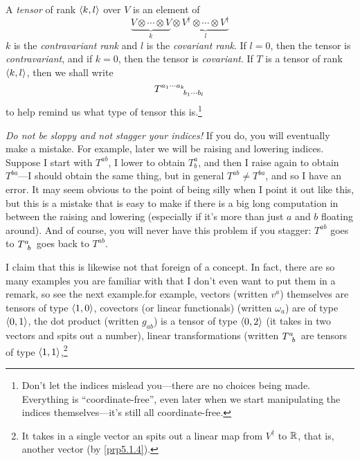 \begin{dfn}[Tensor]\label{Tensor}
A \emph{tensor} of rank $\langle k,l\rangle$ over $V$ is an element of
\begin{equation}
\underbrace{V\otimes \cdots \otimes V}_k\otimes \underbrace{V^{\dagger}\otimes \cdots \otimes V^{\dagger}}_l
\end{equation}
$k$ is the \emph{contravariant rank} and $l$ is the \emph{covariant rank}.  If $l=0$, then the tensor is \emph{contravariant}, and if $k=0$, then the tensor is \emph{covariant}.  If $T$ is a tensor of rank $\langle k,l\rangle$, then we shall write
\begin{equation}
T\indices{^{a_1\cdots a_k}_{b_1\cdots b_l}}
\end{equation}
to help remind us what type of tensor this is.\footnote{Don't let the indices mislead you---there are no choices being made.  Everything is ``coordinate-free'', even later when we start manipulating the indices themselves---it's still all coordinate-free.}
\begin{rmk}
\emph{Do not be sloppy and not stagger your indices!}  If you do, you will eventually make a mistake.  For example, later we will be raising and lowering indices.  Suppose I start with $T^{ab}$, I lower to obtain $T_b^a$, and then I raise again to obtain $T^{ba}$---I should obtain the same thing, but in general $T^{ab}\neq T^{ba}$, and so I have an error.  It may seem obvious to the point of being silly when I point it out like this, but this is a mistake that is easy to make if there is a big long computation in between the raising and lowering (especially if it's more than just $a$ and $b$ floating around).  And of course, you will never have this problem if you stagger:  $T^{ab}$ goes to $T\indices{^a_b}$ goes back to $T^{ab}$.
\end{rmk}
\begin{rmk}
I claim that this is likewise not that foreign of a concept.  In fact, there are so many examples you are familiar with that I don't even want to put them in a remark, so see the next example.for example, vectors (written $v^a$) themselves are tensors of type $\langle1,0\rangle$, covectors (or linear functionals) (written $\omega _a$) are of type $\langle0,1\rangle$, the dot product (written $g_{ab}$) is a tensor of type $\langle0,2\rangle$ (it takes in two vectors and spits out a number), linear transformations (written $T\indices{^a_b}$ are tensors of type $\langle1,1\rangle$,\footnote{It takes in a single vector an spits out a linear map from $V^{\dagger}$ to $\mathbb{R}$, that is, another vector (by \cref{prp5.1.4}).}
\end{rmk}
\end{dfn}
